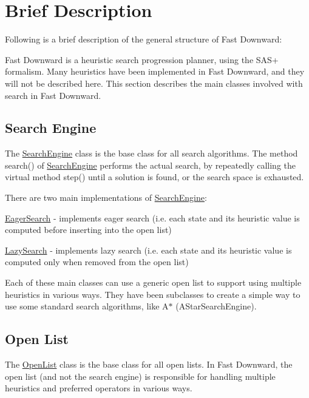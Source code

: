 \hypertarget{index_brief_sec}{}\section{Brief Description}\label{index_brief_sec}
Following is a brief description of the general structure of Fast Downward\-:

Fast Downward is a heuristic search progression planner, using the S\-A\-S+ formalism. Many heuristics have been implemented in Fast Downward, and they will not be described here. This section describes the main classes involved with search in Fast Downward.\hypertarget{index_search_engine_sec}{}\subsection{Search Engine}\label{index_search_engine_sec}
The \hyperlink{classSearchEngine}{Search\-Engine} class is the base class for all search algorithms. The method search() of \hyperlink{classSearchEngine}{Search\-Engine} performs the actual search, by repeatedly calling the virtual method step() until a solution is found, or the search space is exhausted.

There are two main implementations of \hyperlink{classSearchEngine}{Search\-Engine}\-:
\begin{DoxyItemize}
\item \hyperlink{classEagerSearch}{Eager\-Search} -\/ implements eager search (i.\-e. each state and its heuristic value is computed before inserting into the open list)
\item \hyperlink{classLazySearch}{Lazy\-Search} -\/ implements lazy search (i.\-e. each state and its heuristic value is computed only when removed from the open list)
\end{DoxyItemize}

Each of these main classes can use a generic open list to support using multiple heuristics in various ways. They have been subclasses to create a simple way to use some standard search algorithms, like A$\ast$ (A\-Star\-Search\-Engine).\hypertarget{index_open_list_sec}{}\subsection{Open List}\label{index_open_list_sec}
The \hyperlink{classOpenList}{Open\-List} class is the base class for all open lists. In Fast Downward, the open list (and not the search engine) is responsible for handling multiple heuristics and preferred operators in various ways.


